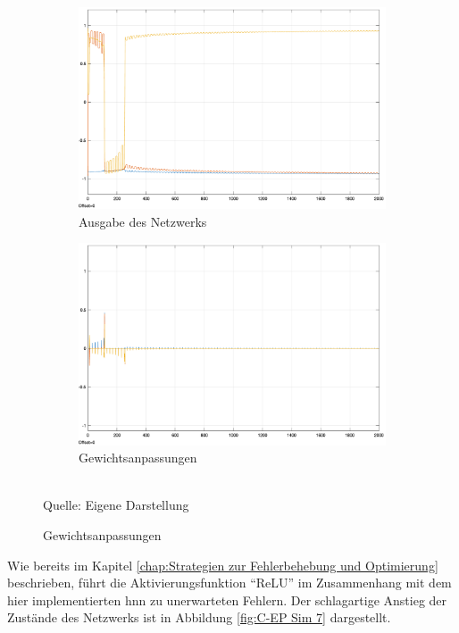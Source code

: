 \begin{figure}[h]
  \label{fig:C-EP Sim 6}
  \caption{Simulationen des \ac{c-ep} mit der Aktivierungsfunktion: \(\rho(x)=tanh(2x)\)}
  \centering
  \begin{subfigure}[b]{0.5\textwidth}
    \includegraphics[width=\textwidth]{abbildungen/c_ep_sim_6_ausgabe.png}
    \caption{Ausgabe des Netzwerks}
  \end{subfigure}%
  \hfill
  \begin{subfigure}[b]{0.5\textwidth}
    \includegraphics[width=\textwidth]{abbildungen/c_ep_sim_6_weight_update.png}
    \caption{Gewichtsanpassungen}
  \end{subfigure}
  \\
  Quelle: Eigene Darstellung
\end{figure}

Wie bereits im Kapitel \ref{chap:Strategien zur Fehlerbehebung und Optimierung} beschrieben, führt die Aktivierungsfunktion "`ReLU"' im Zusammenhang mit dem hier implementierten \ac{hnn} zu unerwarteten Fehlern. Der schlagartige Anstieg der Zustände des Netzwerks ist in Abbildung \ref{fig:C-EP Sim 7} dargestellt.

